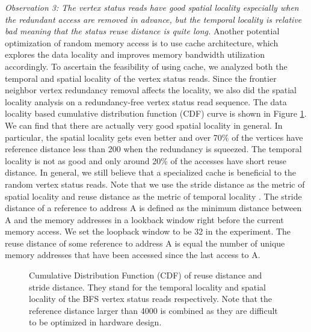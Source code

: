 \textit{Observation 3: The vertex status reads have good 
spatial locality especially when the redundant access are removed in advance, 
but the temporal locality is relative bad meaning that the status reuse 
distance is quite long.}
Another potential optimization of random memory access is to use cache architecture, 
which explores the data locality and improves memory bandwidth utilization 
accordingly. To ascertain the feasibility of using cache, we analyzed both the 
temporal and spatial locality of the vertex status reads. Since 
the frontier neighbor vertex redundancy removal affects the locality, 
we also did the spatial locality analysis on a redundancy-free 
vertex status read sequence. The data locality based cumulative 
distribution function (CDF) curve is shown in 
Figure \ref{fig:youtube-locality}. We can find that there are actually 
very good spatial locality in general. In particular, the spatial 
locality gets even better and over 70\% of the vertices have reference distance 
less than 200 when the redundancy is squeezed. The temporal locality is not as 
good and only around 20\% of the accesses have short reuse distance. In general, 
we still believe that a specialized cache is beneficial to the random 
vertex status reads. Note that we use 
the stride distance as the metric of spatial locality and reuse distance as the metric 
of temporal locality \cite{weinberg2008chameleon}. The stride distance of a reference 
to address A is defined as the minimum distance between A and the 
memory addresses in a lookback window right before the current 
memory access. We set the loopback window to be 32 in the experiment. 
The reuse distance of some reference to 
address A is equal the number of unique memory addresses that have been 
accessed since the last access to A.  

\begin{figure}
\caption{Cumulative Distribution Function (CDF) of reuse distance 
    and stride distance. They stand for the temporal locality and spatial 
    locality of the BFS vertex status reads respectively. Note that the 
    reference distance larger than 4000 is combined as they are difficult 
    to be optimized in hardware design.}
\label{fig:youtube-locality}
\end{figure}

